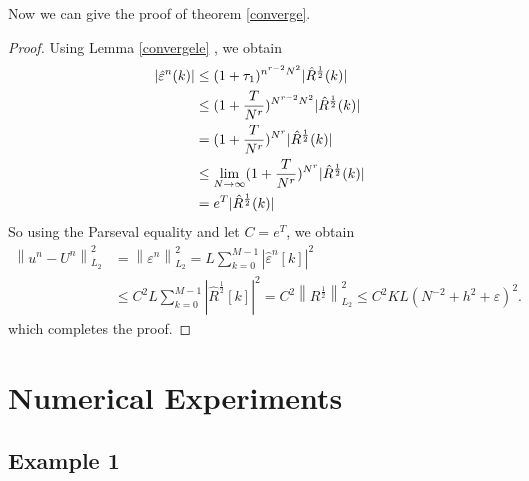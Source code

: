 \documentclass[10pt, reqno]{amsart}
\theoremstyle{remark}
\theoremstyle{definition}
\numberwithin{table}{section}
\begin{document}
Now we can give the proof of theorem \ref{converge}. 
    \begin{proof}
    Using Lemma \ref{convergele} ,  we obtain
\begin{align}
    |\hat{\varepsilon}^n(k)|&\leq (1+\tau_1)^{n^{r-2}N^{2}}|\hat{R}^{\frac{1}{2}}(k)|\notag\\
    &\leq (1+\frac{T}{N^r})^{N^{r-2}N^{2}}|\hat{R}^{\frac{1}{2}}(k)|\notag\\
    &=(1+\frac{T}{N^r})^{N^r}|\hat{R}^{\frac{1}{2}}(k)|\notag\\
    &\leq \lim_{N\to \infty}(1+\frac{T}{N^r})^{N^r}|\hat{R}^{\frac{1}{2}}(k)|\notag\\
    &=e^T|\hat{R}^{\frac{1}{2}}(k)|\notag
\end{align}
    So using the Parseval equality and let $C=e^T$, we obtain
    \begin{equation}
\begin{aligned}
\left\|u^n-U^n\right\|_{L_2}^2 & =\left\|\varepsilon^n\right\|_{L_2}^2=L\sum_{k=0}^{M-1}\left|\hat{\varepsilon}^n[k]\right|^2\\
&\leq C^2L \sum_{k=0}^{M-1}\left|\hat{R}^{\frac{1}{2}}[k]\right|^2=C^2\left\|R^{\frac{1}{2}}\right\|_{L_2}^2\leq C^2KL(N^{-2}+h^2+\varepsilon)^2. 
\end{aligned}
\end{equation}
which completes the proof. 
\end{proof}

\section{Numerical Experiments}
\subsection{Example 1}
\end{document}

